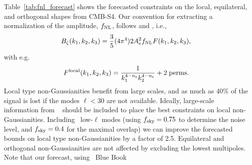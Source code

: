 
%
Table~\ref{tab:fnl_forecast} shows the forecasted constraints on the local, equilateral, and orthogonal shapes from CMB-S4. Our convention for extracting a normalization of the amplitude, $f_{\rm NL}$, follows \cite{Babich:2004gb} and \cite{Ade:2013ydc}, i.e., 
\begin{equation}
B_{\zeta}(k_1,k_2,k_3) = \frac{3}{5} (4 \pi^4) 2 A_{\rm s}^2 f_{\rm NL} F(k_1,k_2,k_3) ,
\end{equation}
with e.g. 
\begin{equation}
F^{\rm local}(k_1,k_2,k_3) = \frac{1}{k_1^{4-n_{\rm s}}k_2^{4-n_{\rm s}}} + {\rm 2\;perms.}
\end{equation}
Local type non-Gaussianities benefit from large scales, and as much as $40\%$ of the signal is lost if the modes $\ell<30$ are not available. 
Ideally, large-scale information from \planck\ \cite{Ade:2015ava} should be included to place the best constraints on local non-Gaussianities. Including \planck\ low-$\ell$ modes (using $f_{\rm sky} = 0.75$ \cite{Ade:2015ava} to determine the noise level, and $f_{\rm sky}=0.4$ for the maximal overlap) we can improve the forecasted bounds on local type non-Gaussianities by a factor of 2.5. Equilateral and orthogonal non-Gaussianities are not affected by excluding the lowest multipoles. Note that our forecast, using \planck\ Blue Book\cite{Planck:2006aa}
